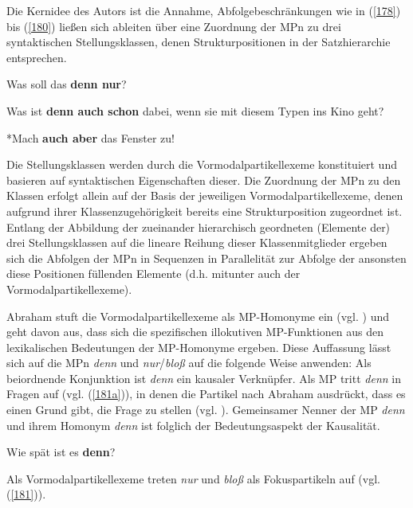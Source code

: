 Die Kernidee des Autors ist die Annahme, Abfolgebeschränkungen wie in (\ref{178}) bis (\ref{180}) ließen sich ableiten über eine Zuordnung der MPn zu drei syntaktischen Stellungsklassen, denen Strukturpositionen in der Satzhierarchie entsprechen. 

\begin{exe}
	\ex\label{178} 
	Was soll das \textbf{denn nur}?
\end{exe}
\vspace{-0.65cm}
\begin{exe}
	\ex\label{179} 
	Was ist \textbf{denn auch schon} dabei, wenn sie mit diesem Typen ins Kino geht?
\end{exe}
\vspace{-0.65cm}
\begin{exe}
	\ex\label{180} 
	*Mach \textbf{auch aber} das Fenster zu!
	\hfill\hbox {\citet[286-287]{Thurmair1989}}
\end{exe}
Die Stellungsklassen werden durch die Vormodalpartikellexeme  konstituiert und basieren auf syntaktischen Eigenschaften dieser. Die Zuordnung der MPn zu den Klassen erfolgt allein auf der Basis der jeweiligen Vormodalpartikellexeme, denen aufgrund ihrer Klassenzugehörigkeit bereits eine Strukturposition zugeordnet ist. Entlang der Abbildung der zueinander hierarchisch geordneten (Elemente der) drei Stellungsklassen auf die lineare Reihung dieser Klassenmitglieder ergeben sich die Abfolgen der MPn in Sequenzen in Parallelität zur Abfolge der ansonsten diese Positionen füllenden Elemente (d.h. mitunter auch der Vormodalpartikellexeme).

Abraham stuft die Vormodalpartikellexeme als MP-Homonyme  ein (vgl. \citeyear[95]{Abraham1995}) und geht davon aus, dass sich die spezifischen illokutiven MP-Funktionen aus den lexikalischen Bedeutungen der MP-Homonyme ergeben. Diese Auffassung lässt sich auf die MPn \textit{denn} und \textit{nur}/\textit{bloß} auf die folgende Weise anwenden: Als beiordnende Konjunktion ist \textit{denn} ein kausaler Verknüpfer. Als MP tritt \textit{denn} in Fragen auf (vgl. (\ref{181a})), in denen die Partikel nach Abraham ausdrückt, dass es einen Grund gibt, die Frage zu stellen (vgl. \citeyear[101]{Abraham1995}). Gemeinsamer Nenner der MP \textit{denn} und ihrem Homonym \textit{denn} ist folglich der Bedeutungsaspekt der Kausalität.

\begin{exe}
	\ex\label{181a} 
	Wie spät ist es \textbf{denn}?
	\hfill\hbox {\citet[99]{Abraham1995}}
\end{exe}
Als Vormodalpartikellexeme treten \textit{nur} und \textit{bloß} als Fokuspartikeln  auf (vgl. (\ref{181})).

